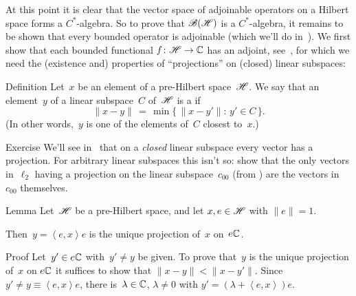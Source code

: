 \documentclass[a]{subfiles}
\begin{document}
\begin{parsec}%
\begin{point}%
At this point
it is clear that the vector space of adjoinable operators
on a Hilbert space forms a $C^*$-algebra.
So to prove that $\mathscr{B}(\mathscr{H})$
is a $C^*$-algebra,
it remains to be shown that every bounded operator
is adjoinable (which we'll do in~).
We first show that each bounded functional $f\colon \mathscr{H}\to \mathbb{C}$
has an adjoint, see~,
for which we need the (existence and) properties of ``projections''
on (closed) linear subspaces:
\end{point}
\begin{point}{Definition}
Let~$x$ be an element of a pre-Hilbert space~$\mathscr{H}$.
We say that an element~$y$ of a linear subspace~$C$
of~$\mathscr{H}$ is a %
if
\begin{equation*}
\|x-y\|\,=\,\min\{\,\|x-y'\|\colon \,y'\in C\,\}.
\end{equation*}
(In other words,~$y$ is one of the elements of~$C$ closest to~$x$.)
\end{point}
\begin{point}{Exercise}%
We'll see in~
that on a \emph{closed}
linear subspace
every vector has a projection.
For arbitrary linear subspaces this
isn't so:
show that the only vectors in~$\ell_2$
having 
a projection on the linear subspace~$c_{00}$
(from )
are the vectors in~$c_{00}$ themselves.
\end{point}
\begin{point}{Lemma}%
Let~$\mathscr{H}$ be a pre-Hilbert space,
and let $x,e\in\mathscr{H}$ with
$\|e\|=1$.

Then~$y=\left<e,x\right>e$ is the unique projection of~$x$ on~$e\mathbb{C}$.
\begin{point}{Proof}%
Let~$y'\in e\mathbb{C}$
with~$y'\neq y$
be given.
To prove that~$y$
is the unique projection of~$x$ on $e\mathbb{C}$
it suffices to show that $\|x-y\|<\|x-y'\|$.
Since~$y'\neq y\equiv \left<e,x\right>e$,
there is~$\lambda\in \mathbb{C}$, $\lambda\neq 0$ 
with $y'=(\lambda+\left<e,x\right>)e$.


\end{point}
\end{point}
\end{parsec}
\end{document}
